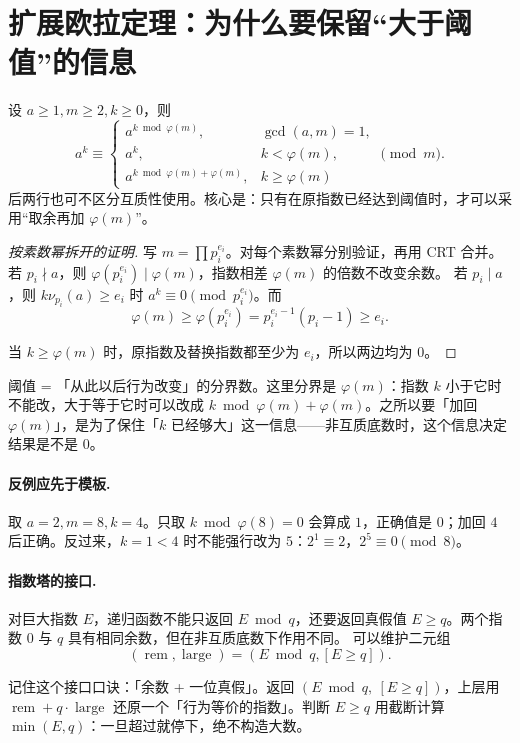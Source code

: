 \documentclass[UTF8,a4paper,11pt,twoside,openright,fontset=fandol]{ctexbook}
\theoremstyle{definition}
\newcommand{\iva}[1]{\left[#1\right]}
\begin{document}
\section{扩展欧拉定理：为什么要保留“大于阈值”的信息}
设 $a\ge1,m\ge2,k\ge0$，则
\[
 a^k\equiv
 \begin{cases}
 a^{k\bmod\varphi(m)},&\gcd(a,m)=1,\\
 a^k,&k<\varphi(m),\\
 a^{k\bmod\varphi(m)+\varphi(m)},&k\ge\varphi(m)
 \end{cases}\pmod m.
\]
后两行也可不区分互质性使用。核心是：只有在原指数已经达到阈值时，才可以采用“取余再加 $\varphi(m)$”。


\begin{proof}[按素数幂拆开的证明]
写 $m=\prod p_i^{e_i}$。对每个素数幂分别验证，再用 CRT 合并。
若 $p_i\nmid a$，则 $\varphi(p_i^{e_i})\mid\varphi(m)$，指数相差 $\varphi(m)$ 的倍数不改变余数。
若 $p_i\mid a$，则 $k\nu_{p_i}(a)\ge e_i$ 时 $a^k\equiv0\pmod{p_i^{e_i}}$。而
\[
\varphi(m)\ge\varphi(p_i^{e_i})=p_i^{e_i-1}(p_i-1)\ge e_i.
\]


当 $k\ge\varphi(m)$ 时，原指数及替换指数都至少为 $e_i$，所以两边均为 $0$。
\end{proof}

\begin{tip}[阈值这个词]
阈值 = 「从此以后行为改变」的分界数。这里分界是 $\varphi(m)$：指数 $k$ 小于它时不能改，大于等于它时可以改成 $k\bmod\varphi(m)+\varphi(m)$。之所以要「加回 $\varphi(m)$」，是为了保住「$k$ 已经够大」这一信息——非互质底数时，这个信息决定结果是不是 $0$。
\end{tip}


\paragraph{反例应先于模板.} 取 $a=2,m=8,k=4$。只取 $k\bmod\varphi(8)=0$ 会算成 $1$，正确值是 $0$；加回 $4$ 后正确。反过来，$k=1<4$ 时不能强行改为 $5$：$2^1\equiv2$，$2^5\equiv0\pmod8$。

\paragraph{指数塔的接口.} 对巨大指数 $E$，递归函数不能只返回 $E\bmod q$，还要返回真假值 $E\ge q$。两个指数 $0$ 与 $q$ 具有相同余数，但在非互质底数下作用不同。
可以维护二元组
\[
 (\operatorname{rem},\operatorname{large})=(E\bmod q,\iva{E\ge q}).
\]

\begin{tip}
记住这个接口口诀：「余数 + 一位真假」。返回 $(E\bmod q,\ \iva{E\ge q})$，上层用 $\operatorname{rem}+q\cdot\operatorname{large}$ 还原一个「行为等价的指数」。判断 $E\ge q$ 用截断计算 $\min(E,q)$：一旦超过就停下，绝不构造大数。
\end{tip}
\end{document}
